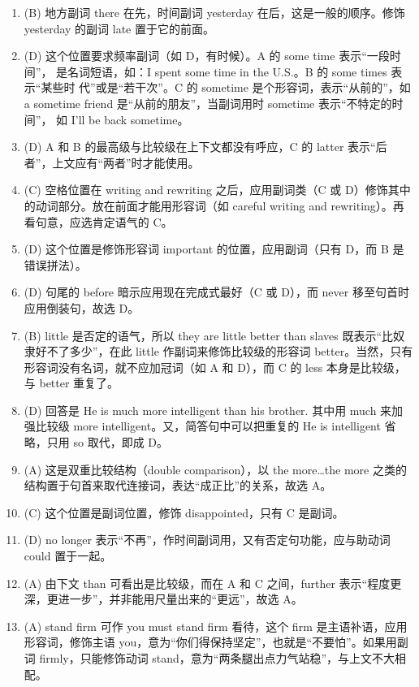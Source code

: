 \documentclass{yufa}
\begin{document}
\begin{enumerate}
\item (B) 地方副词 there 在先，时间副词 yesterday 在后，这是一般的顺序。修饰 yesterday 的副词 late 置于它的前面。
\item (D) 这个位置要求频率副词（如 D，有时候）。A 的 some time 表示“一段时间”，
  是名词短语，如：I spent some time in the U.S.。B 的 some times 表示“某些时
  代”或是“若干次”。C 的 sometime 是个形容词，表示“从前的”，如 a
  sometime friend 是“从前的朋友”，当副词用时 sometime 表示“不特定的时间”，
  如 I’ll be back sometime。
\item (D) A 和 B 的最高级与比较级在上下文都没有呼应，C 的 latter 表示“后者”，上文应有“两者”时才能使用。
\item (C) 空格位置在 writing and rewriting 之后，应用副词类（C 或 D）修饰其中的动词部分。放在前面才能用形容词（如 careful writing and rewriting）。再看句意，应选肯定语气的 C。
\item (D) 这个位置是修饰形容词 important 的位置，应用副词（只有 D，而 B 是错误拼法）。
\item (D) 句尾的 before 暗示应用现在完成式最好（C 或 D），而 never 移至句首时应用倒装句，故选 D。
\item (B) little 是否定的语气，所以 they are little better than slaves 既表示“比奴隶好不了多少”，在此 little 作副词来修饰比较级的形容词 better。当然，只有形容词没有名词，就不应加冠词（如 A 和 D），而 C 的 less 本身是比较级，与 better 重复了。
\item (D) 回答是 He is much more intelligent than his brother. 其中用 much 来加强比较级 more intelligent。又，简答句中可以把重复的 He is intelligent 省略，只用 so 取代，即成 D。
\item (A) 这是双重比较结构（double comparison），以 the more…the more 之类的结构置于句首来取代连接词，表达“成正比”的关系，故选 A。
\item (C) 这个位置是副词位置，修饰 disappointed，只有 C 是副词。
\item (D) no longer 表示“不再”，作时间副词用，又有否定句功能，应与助动词 could 置于一起。

\item (A) 由下文 than 可看出是比较级，而在 A 和 C 之间，further 表示“程度更深，更进一步”，并非能用尺量出来的“更远”，故选 A。

\item (A) stand firm 可作 you must stand firm 看待，这个 firm 是主语补语，应用形容词，修饰主语 you，意为“你们得保持坚定”，也就是“不要怕”。如果用副词 firmly，只能修饰动词 stand，意为“两条腿出点力气站稳”，与上文不大相配。
\end{enumerate}
\end{document}
